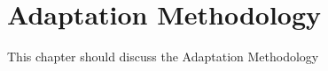 \chapter{Adaptation Methodology}
\label{ChapterAdaptationMethodology}
This chapter should discuss the Adaptation Methodology